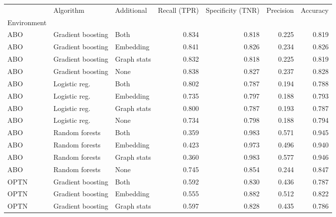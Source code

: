 \begin{tabular}{lllrrrr}
\toprule
{} &          Algorithm &   Additional &  Recall (TPR) &  Specificity (TNR) &  Precision &  Accuracy \\
Environment &                    &              &               &                    &            &           \\
\midrule
ABO         &  Gradient boosting &         Both &         0.834 &              0.818 &      0.225 &     0.819 \\
ABO         &  Gradient boosting &    Embedding &         0.841 &              0.826 &      0.234 &     0.826 \\
ABO         &  Gradient boosting &  Graph stats &         0.832 &              0.818 &      0.225 &     0.819 \\
ABO         &  Gradient boosting &         None &         0.838 &              0.827 &      0.237 &     0.828 \\
ABO         &      Logistic reg. &         Both &         0.802 &              0.787 &      0.194 &     0.788 \\
ABO         &      Logistic reg. &    Embedding &         0.735 &              0.797 &      0.188 &     0.793 \\
ABO         &      Logistic reg. &  Graph stats &         0.800 &              0.787 &      0.193 &     0.787 \\
ABO         &      Logistic reg. &         None &         0.734 &              0.798 &      0.188 &     0.794 \\
ABO         &     Random forests &         Both &         0.359 &              0.983 &      0.571 &     0.945 \\
ABO         &     Random forests &    Embedding &         0.423 &              0.973 &      0.496 &     0.940 \\
ABO         &     Random forests &  Graph stats &         0.360 &              0.983 &      0.577 &     0.946 \\
ABO         &     Random forests &         None &         0.745 &              0.854 &      0.244 &     0.847 \\
OPTN        &  Gradient boosting &         Both &         0.592 &              0.830 &      0.436 &     0.787 \\
OPTN        &  Gradient boosting &    Embedding &         0.555 &              0.882 &      0.512 &     0.822 \\
OPTN        &  Gradient boosting &  Graph stats &         0.597 &              0.828 &      0.435 &     0.786 \\

\end{tabular}
